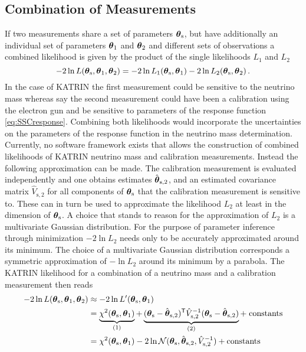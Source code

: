 \subsection{Combination of Measurements}
\label{sec:combinationOfMeasurements}
If two measurements share a set of parameters $\boldsymbol{\mathbf{\theta}}_\mathrm{s}$, but have additionally an individual set of parameters $\boldsymbol{\mathbf{\theta}}_1$ and $\boldsymbol{\mathbf{\theta}}_2$ and different sets of observations a combined likelihood is given by the product of the single likelihoods $L_1$ and $L_2$
\begin{equation}
	-2\ln L(\boldsymbol{\mathbf{\theta}}_\mathrm{s}, \boldsymbol{\mathbf{\theta}}_1, \boldsymbol{\mathbf{\theta}}_2) =  
		-2\ln L_1(\boldsymbol{\mathbf{\theta}}_\mathrm{s}, \boldsymbol{\mathbf{\theta}}_1)
		-2\ln L_2(\boldsymbol{\mathbf{\theta}}_\mathrm{s}, \boldsymbol{\mathbf{\theta}}_2)
	\text{\,.}
\end{equation}
In the case of KATRIN the first measurement could be sensitive to the neutrino mass whereas say the second measurement could have been a calibration using the electron gun and be sensitive to parameters of the response function \eqref{eq:SSCresponse}. Combining both likelihoods would incorporate the uncertainties on the parameters of the response function in the neutrino mass determination. Currently, no software framework exists that allows the construction of combined likelihoods of KATRIN neutrino mass and calibration measurements. Instead the following approximation can be made. The calibration measurement is evaluated independently and one obtains estimates $\hat{\boldsymbol{\mathbf{\theta}}}_\mathrm{s,2}$, and an estimated covariance matrix $\hat{V}_\mathrm{s,2}$ for all components of $\boldsymbol{\mathbf{\theta}}_\mathrm{s}$ that the calibration measurement is sensitive to. These can in turn be used to approximate the likelihood $L_2$ at least in the dimension of $\boldsymbol{\mathbf{\theta}}_\mathrm{s}$. A choice that stands to reason for the approximation of $L_2$ is a multivariate Gaussian distribution. For the purpose of parameter inference through minimization $-2\ln L_2$ needs only to be accurately approximated around its minimum. The choice of a multivariate Gaussian distribution corresponds a symmetric approximation of $-\ln L_2$ around its minimum by a parabola. The KATRIN likelihood for a combination of a neutrino mass and a calibration measurement then reads
\begin{equation}
	\begin{split}
	\label{eq:penalizedLikelihood}
	-2\ln L(\paramVecShared, \paramVec_1, \paramVec_2) &\approx
	-2\ln L^\prime(\paramVecShared, \paramVec_1) \\ &=
	\underbrace{
		\chi^2(\paramVecShared, \paramVec_1)
		\vphantom{(\paramVecShared - \hat{\paramVec}_\mathrm{s,2})^{\mathsf{T}}}
	}_{(1)}
	+
	\underbrace{
		(\paramVecShared - \hat{\paramVec}_\mathrm{s,2})^{\mathsf{T}}
		\hat{V}_\mathrm{s,2}^{-1}
		(\paramVecShared - \hat{\paramVec}_\mathrm{s,2})
	}_{(2)} +\; 
	\mathrm{ constants}\\ &=
	\chi^2(\paramVecShared, \paramVec_1) 
	-2\ln \mathcal{N}(\paramVecShared, \hat{\paramVec}_\mathrm{s,2}, \hat{V}_\mathrm{s,2}^{-1}) +
	\mathrm{ constants}
	\end{split}
\end{equation}

